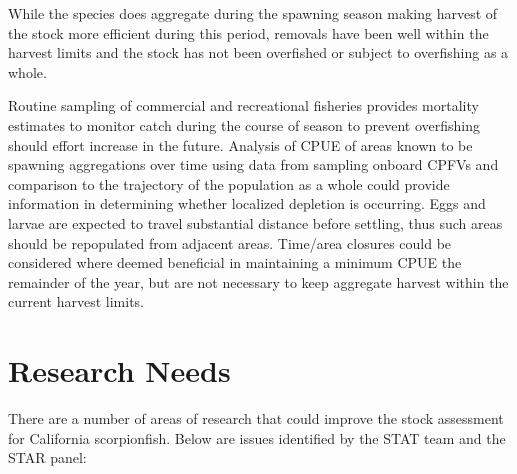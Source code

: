 \documentclass[12pt,]{article}
\begin{document}
While the species does aggregate during the spawning season making
harvest of the stock more efficient during this period, removals have
been well within the harvest limits and the stock has not been
overfished or subject to overfishing as a whole.

Routine sampling of commercial and recreational fisheries provides
mortality estimates to monitor catch during the course of season to
prevent overfishing should effort increase in the future. Analysis of
CPUE of areas known to be spawning aggregations over time using data
from sampling onboard CPFVs and comparison to the trajectory of the
population as a whole could provide information in determining whether
localized depletion is occurring. Eggs and larvae are expected to travel
substantial distance before settling, thus such areas should be
repopulated from adjacent areas. Time/area closures could be considered
where deemed beneficial in maintaining a minimum CPUE the remainder of
the year, but are not necessary to keep aggregate harvest within the
current harvest limits.

\section{Research Needs}\label{research-needs}

There are a number of areas of research that could improve the stock
assessment for California scorpionfish. Below are issues identified by
the STAT team and the STAR panel:
\end{document}
